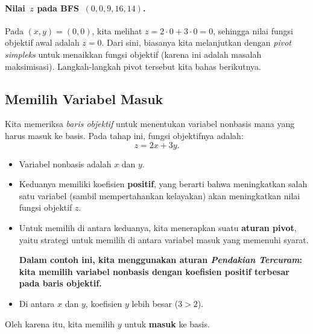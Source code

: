 \paragraph{Nilai \(\,z\) pada BFS \(\,(0,0,9,16,14)\).}
Pada \((x,y)=(0,0)\), kita melihat \(z=2\cdot 0 + 3\cdot 0=0\), sehingga nilai
fungsi objektif awal adalah \(z=0\). Dari sini, biasanya kita melanjutkan dengan
\emph{pivot simpleks} untuk menaikkan fungsi objektif (karena ini adalah
masalah maksimisasi). Langkah-langkah pivot tersebut kita bahas berikutnya.
%
%

\subsection*{Memilih Variabel Masuk}
\begin{tcolorbox}[colback=algenter!6, colframe=algenter, coltitle=white, fonttitle=\bfseries, sharp corners, title={\ding{43}\ Variabel Masuk}]

Kita memeriksa \emph{baris objektif} untuk menentukan variabel nonbasis mana yang harus masuk ke basis. Pada tahap ini, fungsi objektifnya adalah:
\[
z = 2x + 3y.
\]

\begin{itemize}
  \item Variabel nonbasis adalah \(x\) dan \(y\).
  \item Keduanya memiliki koefisien \textbf{positif}, yang berarti bahwa meningkatkan salah satu variabel (sambil mempertahankan kelayakan) akan meningkatkan nilai fungsi objektif \(z\).
  \item Untuk memilih di antara keduanya, kita menerapkan suatu \textbf{aturan pivot}, yaitu strategi untuk memilih di antara variabel masuk yang memenuhi syarat.
  
  \textbf{Dalam contoh ini, kita menggunakan aturan \emph{Pendakian Tercuram}: kita memilih variabel nonbasis dengan koefisien positif terbesar pada baris objektif.}
  
  \item Di antara \(x\) dan \(y\), koefisien \(y\) lebih besar (\(3 > 2\)).
\end{itemize}

Oleh karena itu, kita memilih \(\boxed{y}\) untuk \textbf{masuk} ke basis.

\end{tcolorbox}

